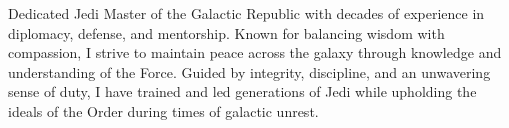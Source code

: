 Dedicated Jedi Master of the Galactic Republic with decades of experience in diplomacy, defense, and mentorship.
Known for balancing wisdom with compassion, I strive to maintain peace across the galaxy through knowledge and understanding of the Force.
Guided by integrity, discipline, and an unwavering sense of duty, I have trained and led generations of Jedi while upholding the ideals of the Order during times of galactic unrest.